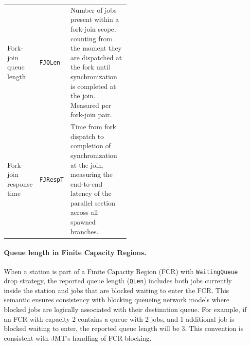 \begin{table}[thbp]
{\begin{tabular}{|l|l|p{0.5\linewidth}|}
Fork-join queue length & \texttt{FJQLen} & Number of jobs present within a fork-join scope, counting from the moment they are dispatched at the fork until synchronization is completed at the join. Measured per fork-join pair. \\
Fork-join response time & \texttt{FJRespT} & Time from fork dispatch to completion of synchronization at the join, measuring the end-to-end latency of the parallel section across all spawned branches. \\
\hline
\end{tabular}
}
\label{TAB_METRICS}
\end{table}

\paragraph{Queue length in Finite Capacity Regions.}
When a station is part of a Finite Capacity Region (FCR) with \texttt{WaitingQueue} drop strategy, the reported queue length (\texttt{QLen}) includes both jobs currently inside the station and jobs that are blocked waiting to enter the FCR. This semantic ensures consistency with blocking queueing network models where blocked jobs are logically associated with their destination queue. For example, if an FCR with capacity 2 contains a queue with 2 jobs, and 1 additional job is blocked waiting to enter, the reported queue length will be 3. This convention is consistent with JMT's handling of FCR blocking.

